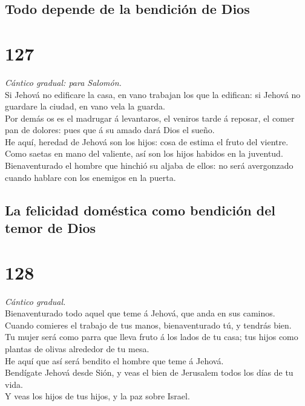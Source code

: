\hypertarget{todo-depende-de-la-bendiciuxf3n-de-dios}{%
\subsection{Todo depende de la bendición de
Dios}\label{todo-depende-de-la-bendiciuxf3n-de-dios}}

\hypertarget{section-126}{%
\section{127}\label{section-126}}

 \emph{Cántico gradual: para Salomón.}\\
Si Jehová no edificare la casa, en vano trabajan los que la edifican: si
Jehová no guardare la ciudad, en vano vela la guarda.\\
 Por demás os es el madrugar á levantaros, el veniros tarde
á reposar, el comer pan de dolores: pues que á su amado dará Dios el
sueño.\\
 He aquí, heredad de Jehová son los hijos: cosa de estima el
fruto del vientre.\\
 Como saetas en mano del valiente, así son los hijos habidos
en la juventud.\\
 Bienaventurado el hombre que hinchió su aljaba de ellos: no
será avergonzado cuando hablare con los enemigos en la puerta.

\hypertarget{la-felicidad-domuxe9stica-como-bendiciuxf3n-del-temor-de-dios}{%
\subsection{La felicidad doméstica como bendición del temor de
Dios}\label{la-felicidad-domuxe9stica-como-bendiciuxf3n-del-temor-de-dios}}

\hypertarget{section-127}{%
\section{128}\label{section-127}}

 \emph{Cántico gradual.}\\
Bienaventurado todo aquel que teme á Jehová, que anda en sus caminos.\\
 Cuando comieres el trabajo de tus manos, bienaventurado tú,
y tendrás bien.\\
 Tu mujer será como parra que lleva fruto á los lados de tu
casa; tus hijos como plantas de olivas alrededor de tu mesa.\\
 He aquí que así será bendito el hombre que teme á Jehová.\\
 Bendígate Jehová desde Sión, y veas el bien de Jerusalem
todos los días de tu vida.\\
 Y veas los hijos de tus hijos, y la paz sobre Israel.


